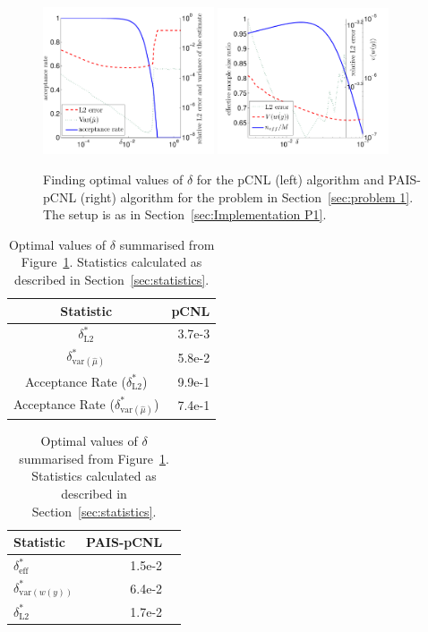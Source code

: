 \documentclass[final]{siamltex}
\begin{document}
\begin{figure}[htb]
\centering
\includegraphics[width=0.45\textwidth]{"figures/pCNL1o"}
\includegraphics[width=0.45\textwidth]{"figures/PAISpCNL1o"}
\caption{Finding optimal values of $\delta$ for the pCNL (left) algorithm and PAIS-pCNL (right) algorithm for the problem in Section~\ref{sec:problem 1}. The setup is as in Section~\ref{sec:Implementation P1}.}
\label{fig:P1 opt delta}
\end{figure}

\begin{table}[!htb]
    \begin{minipage}{.5\linewidth}
      \centering
        \begin{tabular}{|c|r|}
	\hline
	Statistic											& pCNL \\ \hline
	$\delta_{\text{L2}}^*$								& 3.7e-3 \\
	$\delta_{\text{var}(\hat{\mu})}^*$					& 5.8e-2 \\
	Acceptance Rate ($\delta_{\text{L2}}^*$)				& 9.9e-1 \\
	Acceptance Rate ($\delta_{\text{var}(\hat{\mu})}^*$)	& 7.4e-1 \\
	\hline
	\end{tabular}
    \end{minipage}%
    \begin{minipage}{.5\linewidth}
      \centering
        \begin{tabular}{|l|r|r|}
	\hline
	Statistic							& PAIS-pCNL \\ \hline
	$\delta_{\text{eff}}^*$				& 1.5e-2 \\
	$\delta_{\text{var}(w(y))}^*$		& 6.4e-2 \\
	$\delta_{\text{L2}}^*$				& 1.7e-2 \\
	\hline
	\end{tabular}
    \end{minipage}
	\caption{Optimal values of $\delta$ summarised from Figure~\ref{fig:P1 opt delta}. Statistics calculated as described in Section~\ref{sec:statistics}.}
	\label{table:prob1 opt delta}
\end{table}
\end{document}
